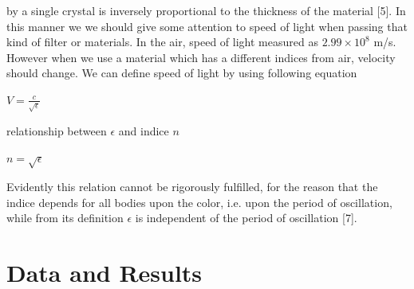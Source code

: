 \documentclass[a4paper,12pt]{report}
\begin{document}
by a single crystal is inversely proportional to the thickness of the material [5]. In this manner we we should give some attention to speed of light when passing that kind of filter or materials. In the air, speed of light measured as $2.99\times10^{8}$ m/s. However when we use a material which has a different indices from air, velocity should change. We can define speed of light by using following equation
\begin{center}
{\Large 	$V=\frac{c}{\sqrt{\epsilon}}$}
\end{center}
relationship between $\epsilon$ and indice $n$
\begin{center}
	$n=\sqrt{\epsilon}$
\end{center}
Evidently this relation cannot be rigorously fulfilled, for the reason that the indice depends for all bodies upon the color, i.e. upon the period of oscillation, while from its definition $\epsilon$ is independent of the period of oscillation [7]. 





































\chapter{Data and Results}
\end{document}
